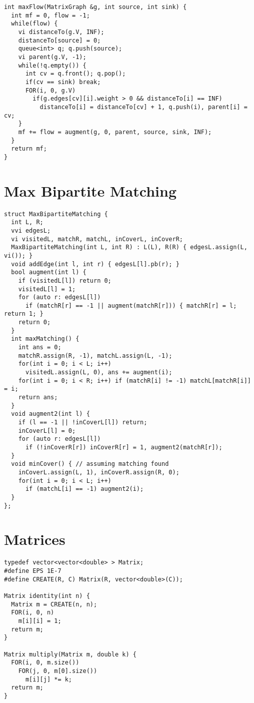 \documentclass[8pt, oneside]{extarticle}
\begin{document}
\begin{multicols}{3}
\begin{lstlisting}
int maxFlow(MatrixGraph &g, int source, int sink) {
  int mf = 0, flow = -1;
  while(flow) {
    vi distanceTo(g.V, INF);
    distanceTo[source] = 0;
    queue<int> q; q.push(source);
    vi parent(g.V, -1);
    while(!q.empty()) {
      int cv = q.front(); q.pop();
      if(cv == sink) break;
      FOR(i, 0, g.V)
        if(g.edges[cv][i].weight > 0 && distanceTo[i] == INF)
          distanceTo[i] = distanceTo[cv] + 1, q.push(i), parent[i] = cv;
    }
    mf += flow = augment(g, 0, parent, source, sink, INF);
  }
  return mf;
}
\end{lstlisting}

\section{Max Bipartite Matching}
\begin{lstlisting}
struct MaxBipartiteMatching {
  int L, R;
  vvi edgesL;
  vi visitedL, matchR, matchL, inCoverL, inCoverR;
  MaxBipartiteMatching(int L, int R) : L(L), R(R) { edgesL.assign(L, vi()); }
  void addEdge(int l, int r) { edgesL[l].pb(r); }
  bool augment(int l) {
    if (visitedL[l]) return 0;
    visitedL[l] = 1;
    for (auto r: edgesL[l])
      if (matchR[r] == -1 || augment(matchR[r])) { matchR[r] = l; return 1; }
    return 0;
  }
  int maxMatching() {
    int ans = 0;
    matchR.assign(R, -1), matchL.assign(L, -1);
    for(int i = 0; i < L; i++)
      visitedL.assign(L, 0), ans += augment(i);
    for(int i = 0; i < R; i++) if (matchR[i] != -1) matchL[matchR[i]] = i;
    return ans;
  }
  void augment2(int l) {
    if (l == -1 || !inCoverL[l]) return;
    inCoverL[l] = 0;
    for (auto r: edgesL[l])
      if (!inCoverR[r]) inCoverR[r] = 1, augment2(matchR[r]);
  }
  void minCover() { // assuming matching found
    inCoverL.assign(L, 1), inCoverR.assign(R, 0);
    for(int i = 0; i < L; i++)
      if (matchL[i] == -1) augment2(i);
  }
};
\end{lstlisting}

\section{Matrices}
\begin{lstlisting}
typedef vector<vector<double> > Matrix;
#define EPS 1E-7
#define CREATE(R, C) Matrix(R, vector<double>(C));

Matrix identity(int n) {
  Matrix m = CREATE(n, n);
  FOR(i, 0, n)
    m[i][i] = 1;
  return m;
}

Matrix multiply(Matrix m, double k) {
  FOR(i, 0, m.size())
    FOR(j, 0, m[0].size())
      m[i][j] *= k;
  return m;
}


\end{lstlisting}
\end{multicols}
\end{document}
